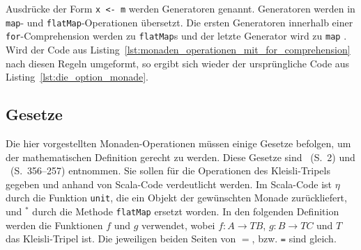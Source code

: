 Ausdrücke der Form \lstinline|x <- m| werden Generatoren genannt.
Generatoren werden in \lstinline|map|- und \lstinline|flatMap|-Operationen übersetzt.
Die ersten Generatoren innerhalb einer \lstinline|for|-Comprehension werden zu \lstinline|flatMap|s und der letzte Generator wird zu \lstinline|map| \cite[vgl.][S.~525]{programming_in_scala}.
Wird der Code aus Listing~\ref{lst:monaden_operationen_mit_for_comprehension} nach diesen Regeln umgeformt, so ergibt sich wieder der ursprüngliche Code aus Listing~\ref{lst:die_option_monade}.


\subsection{Gesetze} %
\label{sub:monadische_gesetze}

Die hier vorgestellten Monaden-Operationen müssen einige Gesetze befolgen, um der mathematischen Definition gerecht zu werden.
Diese Gesetze sind \citealt{monads_program_structure}~(S.~2) und \citealt{real_world_haskell}~(S.~356--257) entnommen.
Sie sollen für die Operationen des Kleisli-Tripels gegeben und anhand von Scala-Code verdeutlicht werden.
Im Scala-Code ist $\eta$ durch die Funktion \lstinline|unit|, die ein Objekt der gewünschten Monade zurückliefert, und $^*$ durch die Methode \lstinline|flatMap| ersetzt worden.
In den folgenden Definition werden die Funktionen $f$ und $g$ verwendet, wobei $f: A \to T B$, $g: B \to T C$ und $T$ das Kleisli-Tripel ist.
Die jeweiligen beiden Seiten von $=$, bzw. \lstinline|=| sind gleich.

